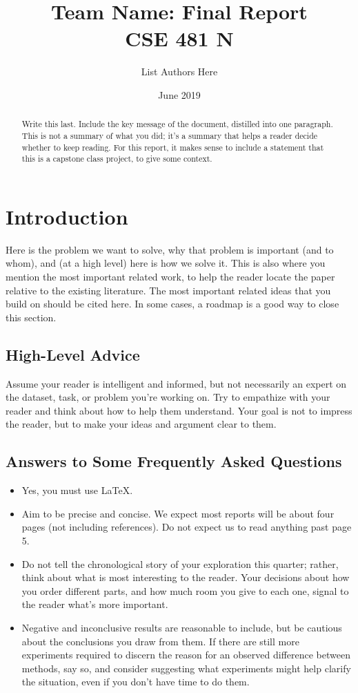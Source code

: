 \documentclass[11pt,letterpaper]{article}
\title{Team Name:  Final Report \\ CSE 481 N}
\author{List Authors Here}
\date{June 2019}
\begin{document}
\maketitle

\begin{abstract}
Write this last.  Include the key message of the document, distilled into one paragraph.  This is not a summary of what you did; it’s a summary that helps a reader decide whether to keep reading.  For this report, it makes sense to include a statement that this is a capstone class project, to give some context.
\end{abstract}

\section{Introduction}

Here is the problem we want to solve, why that problem is important (and to whom), and (at a high level) here is how we solve it.  This is also where you mention the most important related work, to help the reader locate the paper relative to the existing literature.  The most important related ideas that you build on should be cited here.  In some cases, a roadmap is a good way to close this section.

\subsection{High-Level Advice}
Assume your reader is intelligent and informed, but not necessarily an expert on the dataset, task, or problem you're working on.  Try to empathize with your reader and think about how to help them understand.  Your goal is not to impress the reader, but to make your ideas and argument clear to them.

\subsection{Answers to Some Frequently Asked Questions}
\begin{itemize}
\item Yes, you must use \LaTeX.
\item Aim to be precise and concise.  We expect most reports will be about four pages (not including references).  Do not expect us to read anything past page 5.
\item Do not tell the chronological story of your exploration this quarter; rather, think about what is most interesting to the reader.  Your decisions about how you order different parts, and how much room you give to each one, signal to the reader what's more important.
\item Negative and inconclusive results are reasonable to include, but be cautious about the conclusions you draw from them.  If there are still more experiments required to discern the reason for an observed difference between methods, say so, and consider suggesting what experiments might help clarify the situation, even if you don't have time to do them.
\end{itemize}
\end{document}
